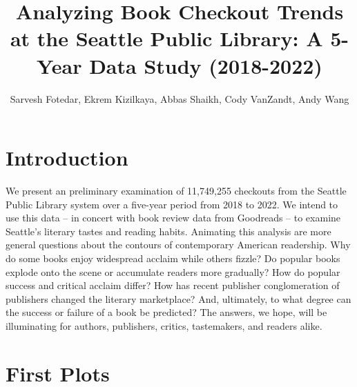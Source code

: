 \documentclass[10pt]{article}\usepackage[]{graphicx}\usepackage[]{color}
\begin{document}
\title{Analyzing Book Checkout Trends at the Seattle Public Library: A 5-Year Data Study (2018-2022)}
\author{Sarvesh Fotedar, Ekrem Kizilkaya, Abbas Shaikh, Cody VanZandt, Andy Wang}
\maketitle
\tableofcontents

\newpage

\section{Introduction}
We present an preliminary examination of 11,749,255 checkouts from the Seattle Public Library system over a five-year period from 2018 to 2022. We intend to use this data -- in concert with book review data from Goodreads -- to examine Seattle's literary tastes and reading habits.
Animating this analysis are more general questions about the contours of contemporary American readership. 
Why do some books enjoy widespread acclaim while others fizzle?
Do popular books explode onto the scene or accumulate readers more gradually?
How do popular success and critical acclaim differ?
How has recent publisher conglomeration of publishers changed the literary marketplace? 
And, ultimately, to what degree can the success or failure of a book be predicted?
The answers, we hope, will be illuminating for authors, publishers, critics, tastemakers, and readers alike. 

\section{First Plots}
\end{document}
